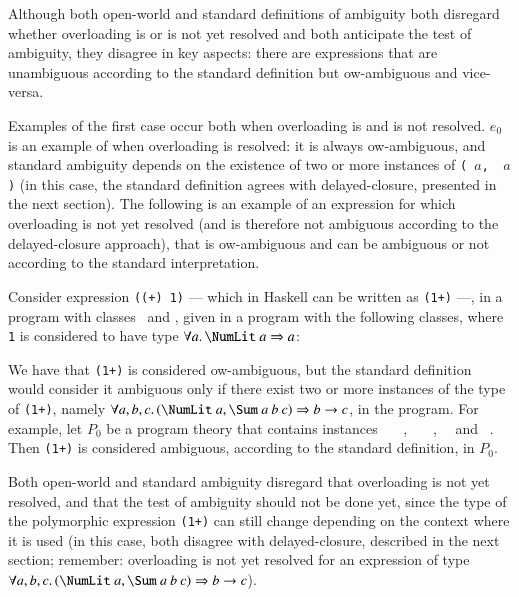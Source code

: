 \documentclass[review]{elsarticle}
\begin{document}
Although both open-world and standard definitions of ambiguity both
disregard whether overloading is or is not yet resolved and both
anticipate the test of ambiguity, they disagree in key aspects: there
are expressions that are unambiguous according to the standard
definition but ow-ambiguous and vice-versa.

Examples of the first case occur both when overloading is and is not
resolved. $e_0$ is an example of when overloading is resolved: it is
always ow-ambiguous, and standard ambiguity depends on the existence
of two or more instances of {\tt (\SShow\ $a$, \RRead\ $a$)} (in this
case, the standard definition agrees with delayed-closure, presented
in the next section). The following is an example of an expression for
which overloading is not yet resolved (and is therefore not ambiguous
according to the delayed-closure approach), that is ow-ambiguous and
can be ambiguous or not according to the standard interpretation.

\begin{Example} \label{ExPlus1}
 Consider expression {\tt ((+) 1)} --- which in Haskell can be written
 as {\tt (1+)} ---, in a program with classes \Sum\ and \NumLit, given
 in a program with the following classes, where {\tt 1} is considered
 to have type $\forall a.\,\NumLit\ a \Rightarrow a$:


We have that {\tt (1+)} is considered ow-ambiguous, but the standard
definition would consider it ambiguous only if there exist two or more
instances of the type of {\tt (1+)}, namely $\forall
a,b,c.\,(\NumLit\ a, \Sum\ a\: b\: c)\Rightarrow b \rightarrow c$, in
the program.  For example, let $P_0$ be a program theory that contains
instances \Sum\ \Int\ \Float\ \Float, \Sum\ \Float\ \Float\ \Float,
\NumLit\ \Int\ and \NumLit\ \Float. Then {\tt (1+)} is considered
ambiguous, according to the standard definition, in $P_0$.

Both open-world and standard ambiguity disregard that overloading is
not yet resolved, and that the test of ambiguity should not be done
yet, since the type of the polymorphic expression {\tt (1+)} can still
change depending on the context where it is used (in this case, both
disagree with delayed-closure, described in the next section;
remember: overloading is not yet resolved for an expression of type
$\forall a,b,c.\,(\NumLit\ a, \Sum\ a\: b\: c)\Rightarrow b
\rightarrow c$).

\end{Example}
\end{document}
